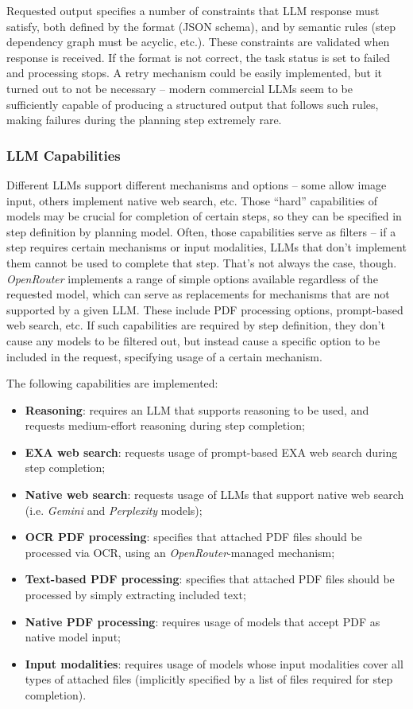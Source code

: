 \documentclass[a4paper,11pt,twoside]{report}
\theoremstyle{definition}
\begin{document}
Requested output specifies a number of constraints that LLM response must satisfy, both defined by the format (JSON schema), and by semantic rules (step dependency graph must be acyclic, etc.). These constraints are validated when response is received. If the format is not correct, the task status is set to failed and processing stops. A retry mechanism could be easily implemented, but it turned out to not be necessary -- modern commercial LLMs seem to be sufficiently capable of producing a structured output that follows such rules, making failures during the planning step extremely rare.

\subsubsection{LLM Capabilities}

Different LLMs support different mechanisms and options -- some allow image input, others implement native web search, etc. Those ``hard'' capabilities of models may be crucial for completion of certain steps, so they can be specified in step definition by planning model. Often, those capabilities serve as filters -- if a step requires certain mechanisms or input modalities, LLMs that don't implement them cannot be used to complete that step. That's not always the case, though. \textit{OpenRouter} implements a range of simple options available regardless of the requested model, which can serve as replacements for mechanisms that are not supported by a given LLM. These include PDF processing options, prompt-based web search, etc. If such capabilities are required by step definition, they don't cause any models to be filtered out, but instead cause a specific option to be included in the request, specifying usage of a certain mechanism.

The following capabilities are implemented:

\begin{itemize}
    \item \textbf{Reasoning}: requires an LLM that supports reasoning to be used, and requests medium-effort reasoning during step completion; 
    \item \textbf{EXA web search}: requests usage of prompt-based EXA web search during step completion;
    \item \textbf{Native web search}: requests usage of LLMs that support native web search (i.e. \textit{Gemini} and \textit{Perplexity} models); 
    \item \textbf{OCR PDF processing}: specifies that attached PDF files should be processed via OCR, using an \textit{OpenRouter}-managed mechanism;
    \item \textbf{Text-based PDF processing}: specifies that attached PDF files should be processed by simply extracting included text;
    \item \textbf{Native PDF processing}: requires usage of models that accept PDF as native model input;
    \item \textbf{Input modalities}: requires usage of models whose input modalities cover all types of attached files (implicitly specified by a list of files required for step completion).
\end{itemize}
\end{document}
